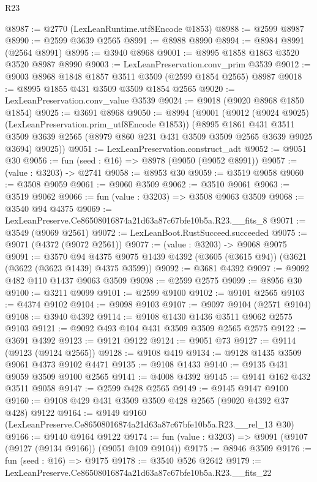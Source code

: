 \begin{lexlean}{R23}
\begin{coremodule}
@8987 := @2770 (LexLeanRuntime.utf8Encode @1853)
@8988 := @2599 @8987
@8990 := @2599 @3639 @2565
@8991 := @8988 @8990
@8994 := @8984 @8991 (@2564 @8991)
@8995 := @3940 @8968
@9001 := @8995 @1858 @1863 @3520 @3520 @8987 @8990
@9003 := LexLeanPreservation.conv_prim @3539
@9012 := @9003 @8968 @1848 @1857 @3511 @3509 (@2599 @1854 @2565) @8987
@9018 := @8995 @1855 @431 @3509 @3509 @1854 @2565
@9020 := LexLeanPreservation.conv_value @3539
@9024 := @9018 (@9020 @8968 @1850 @1854)
@9025 := @3691 @8968
@9050 := @8994
    (@9001
      (@9012 (@9024 @9025) (LexLeanPreservation.prim_utf8Encode @1853))
      (@8995
        @1861
        @431
        @3511
        @3509
        @3639
        @2565
        (@8979 @860 @231 @431 @3509 @3509 @2565 @3639 @9025 @3694)
        @9025))
@9051 := LexLeanPreservation.construct_adt
@9052 := @9051 @30
@9056 := fun (seed : @16) => @8978 (@9050 (@9052 @8991))
@9057 := (value : @3203) -> @2741
@9058 := @8953 @30
@9059 := @3519 @9058
@9060 := @3508 @9059
@9061 := @9060 @3509
@9062 := @3510 @9061
@9063 := @3519 @9062
@9066 := fun (value : @3203) => @3508 @9063 @3509
@9068 := @3540 @94 @4375
@9069 := LexLeanPreserve.Ce86508016874a21d63a87c67bfe10b5a.R23.__fits_8
@9071 := @3549 (@9069 @2561)
@9072 := LexLeanBoot.RustSucceed.succeeded
@9075 := @9071 (@4372 (@9072 @2561))
@9077 := (value : @3203) -> @9068 @9075
@9091 := @3570
    @94
    @4375
    @9075
    @1439
    @4392
    (@3605 (@3615 @94))
    (@3621 (@3622 (@3623 @1439) @4375 @3599))
@9092 := @3681 @4392
@9097 := @9092 @482 @110 @1437 @9063 @3509
@9098 := @2599 @2575
@9099 := @8956 @30
@9100 := @3211 @9099
@9101 := @2599 @9100
@9102 := @9101 @2565
@9103 := @4374 @9102
@9104 := @9098 @9103
@9107 := @9097 @9104 (@2571 @9104)
@9108 := @3940 @4392
@9114 := @9108 @1430 @1436 @3511 @9062 @2575 @9103
@9121 := @9092 @493 @104 @431 @3509 @3509 @2565 @2575
@9122 := @3691 @4392
@9123 := @9121 @9122
@9124 := @9051 @73
@9127 := @9114 (@9123 (@9124 @2565))
@9128 := @9108 @419
@9134 := @9128 @1435 @3509 @9061 @4373 @9102 @4471
@9135 := @9108 @1433
@9140 := @9135 @431 @9059 @3509 @9100 @2565
@9141 := @4008 @4392
@9145 := @9141 @162 @432 @3511 @9058
@9147 := @2599 @428 @2565
@9149 := @9145 @9147 @9100
@9160 := @9108 @429 @431 @3509 @3509 @428 @2565 (@9020 @4392 @37 @428) @9122
@9164 := @9149 @9160 (LexLeanPreserve.Ce86508016874a21d63a87c67bfe10b5a.R23.__rel_13 @30)
@9166 := @9140 @9164 @9122
@9174 := fun (value : @3203) => @9091 (@9107 (@9127 (@9134 @9166)) (@9051 @109 @9104))
@9175 := @8946 @3509
@9176 := fun (seed : @16) => @9175
@9178 := @3540 @526 @2642
@9179 := LexLeanPreserve.Ce86508016874a21d63a87c67bfe10b5a.R23.__fits_22

\end{coremodule}
\end{lexlean}
